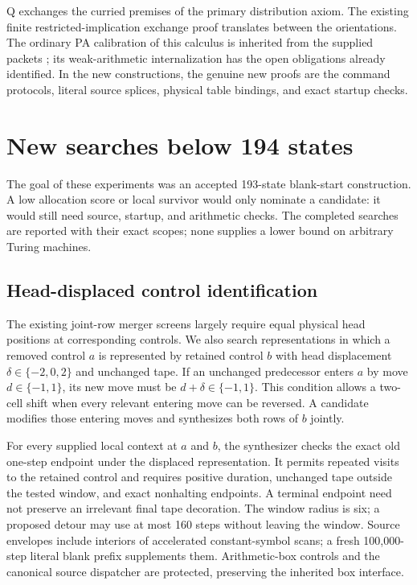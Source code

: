 \documentclass[11pt]{article}
\theoremstyle{definition}\newtheorem{definition}[theorem]{Definition}
\begin{document}
Q exchanges the curried premises of the primary distribution axiom.
The existing finite restricted-implication exchange proof translates
between the orientations. The ordinary PA calibration of this calculus
is inherited from the supplied packets \cite{primary,generalizer}; its weak-arithmetic internalization
has the open obligations already identified. In the new constructions,
the genuine new proofs are the command protocols, literal source splices,
physical table bindings, and exact startup checks.




\section{New searches below 194 states}
\label{sec:searches}

The goal of these experiments was an accepted 193-state blank-start
construction. A low allocation score or local survivor would only nominate
a candidate: it would still need source, startup, and arithmetic checks.
The completed searches are reported with their exact scopes; none supplies
a lower bound on arbitrary Turing machines.

\subsection{Head-displaced control identification}

The existing joint-row merger screens largely require equal physical head
positions at corresponding controls. We also search representations in
which a removed control $a$ is represented by retained control $b$ with
head displacement $\delta\in\{-2,0,2\}$ and unchanged tape.
If an unchanged predecessor enters $a$ by move $d\in\{-1,1\}$, its new
move must be $d+\delta\in\{-1,1\}$. This condition allows a two-cell
shift when every relevant entering move can be reversed. A candidate
modifies those entering moves and synthesizes both rows of $b$ jointly.

For every supplied local context at $a$ and $b$, the synthesizer checks
the exact old one-step endpoint under the displaced representation.
It permits repeated visits to the retained control and requires positive
duration, unchanged tape outside the tested window, and exact nonhalting
endpoints. A terminal endpoint need not preserve an irrelevant final tape
decoration. The window radius is six; a proposed detour may use at most
160 steps without leaving the window. Source envelopes include interiors
of accelerated constant-symbol scans; a fresh 100,000-step literal blank
prefix supplements them. Arithmetic-box controls and the canonical source
dispatcher are protected, preserving the inherited box interface.
\end{document}
